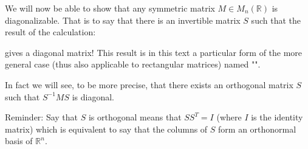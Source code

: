 	\begin{theorem}
		We will now be able to show that any symmetric matrix $M \in M_n(\mathbb{R})$ is diagonalizable. That is to say that there is an invertible matrix $S$ such that the result of the calculation:
	
	gives a diagonal matrix! This result is in this text a particular form of the more general case (thus also applicable to rectangular matrices) named "".
	\begin{tcolorbox}[title=Remark,colframe=black,arc=10pt]
	In fact we will see, to be more precise, that there exists an orthogonal matrix $S$ such that $S^{-1}MS$ is diagonal.
	\end{tcolorbox}
	Reminder: Say that $S$ is orthogonal means that $SS^T=I$ (where $I$ is the identity matrix) which is equivalent to say that the columns of $S$ form an orthonormal basis of $\mathbb{R}^n$.
	\end{theorem}
